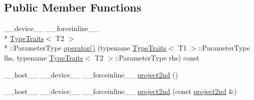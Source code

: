 \subsection*{Public Member Functions}
\begin{DoxyCompactItemize}
\item 
\-\_\-\-\_\-device\-\_\-\-\_\- \-\_\-\-\_\-forceinline\-\_\-\-\_\- \\*
\hyperlink{structcv_1_1gpu_1_1device_1_1TypeTraits}{Type\-Traits}$<$ T2 $>$\\*
\-::Parameter\-Type \hyperlink{structcv_1_1gpu_1_1device_1_1project2nd_a5099de2ec6d46a45c5c3cf8c18c2df77}{operator()} (typename \hyperlink{structcv_1_1gpu_1_1device_1_1TypeTraits}{Type\-Traits}$<$ T1 $>$\-::Parameter\-Type lhs, typename \hyperlink{structcv_1_1gpu_1_1device_1_1TypeTraits}{Type\-Traits}$<$ T2 $>$\-::Parameter\-Type rhs) const 
\item 
\-\_\-\-\_\-host\-\_\-\-\_\- \-\_\-\-\_\-device\-\_\-\-\_\- \-\_\-\-\_\-forceinline\-\_\-\-\_\- \hyperlink{structcv_1_1gpu_1_1device_1_1project2nd_a30e7d611d07ce3b0be0e5f09c2e5c586}{project2nd} ()
\item 
\-\_\-\-\_\-host\-\_\-\-\_\- \-\_\-\-\_\-device\-\_\-\-\_\- \-\_\-\-\_\-forceinline\-\_\-\-\_\- \hyperlink{structcv_1_1gpu_1_1device_1_1project2nd_afd6acf1621e14be81f79263e32f59d9b}{project2nd} (const \hyperlink{structcv_1_1gpu_1_1device_1_1project2nd}{project2nd} \&)
\end{DoxyCompactItemize}


